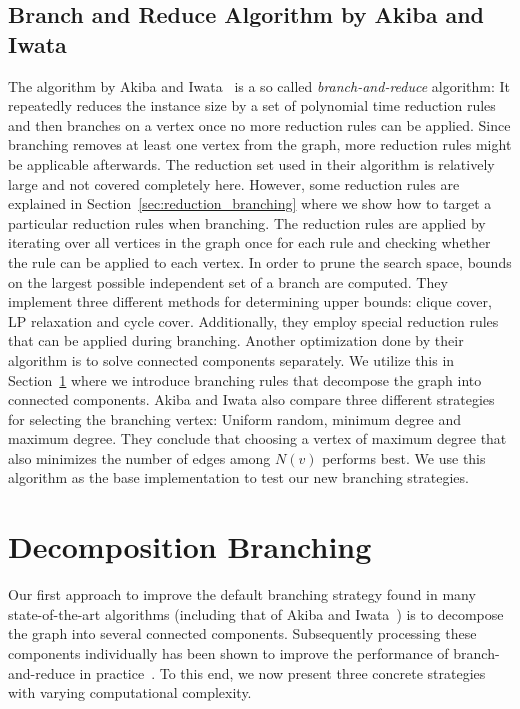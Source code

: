 \documentclass[a4paper,UKenglish,cleveref, autoref, thm-restate]{lipics-v2021}
\begin{document}
\subsection{Branch and Reduce Algorithm by Akiba and Iwata~\cite{AkibaIwata}}

The algorithm by Akiba and Iwata~\cite{AkibaIwata} is a so called
\emph{branch-and-reduce} algorithm: It repeatedly reduces the instance size by a
set of polynomial time reduction rules and then branches on a vertex once no
more reduction rules can be applied. Since branching removes at least one vertex
from the graph, more reduction rules might be applicable afterwards. The
reduction set used in their algorithm is relatively large and not covered
completely here. However, some reduction rules are explained in
Section~\ref{sec:reduction_branching} where we show how to target a particular reduction
rules when branching. The reduction rules are applied by iterating over all
vertices in the graph once for each rule and checking whether the rule
can be applied to each vertex. In order to prune the search space, bounds on the largest
possible independent set of a branch are computed. They implement three different
methods for determining upper bounds: clique cover, LP relaxation and cycle
cover. Additionally, they employ special reduction rules that can be applied
during branching. Another optimization done by their algorithm is to solve
connected components separately. We utilize this in
Section~\ref{sec:decomposition_branching} where we introduce branching rules
that decompose the graph into connected components. Akiba and Iwata also
compare three different strategies for
selecting the branching vertex: Uniform random, minimum degree and maximum
degree. They conclude that choosing a vertex of maximum degree that also
minimizes the number of edges among $N(v)$ performs best. We use this algorithm
as the base implementation to test our new branching strategies.

\section{Decomposition Branching}
\label{sec:decomposition_branching}
Our first approach to improve the default branching strategy found in many state-of-the-art algorithms (including that of Akiba and Iwata~\cite{AkibaIwata}) is to decompose the graph into several connected components.
Subsequently processing these components individually has been shown to improve the performance of branch-and-reduce in practice~\cite{alsahafy2020computing}.
To this end, we now present three concrete strategies with varying computational complexity.
\end{document}
